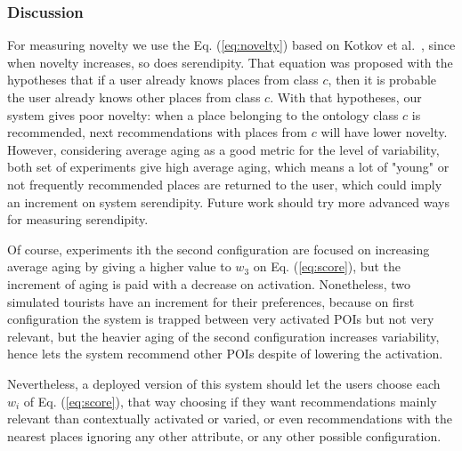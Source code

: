 \subsubsection{Discussion}

For measuring novelty we use the Eq. (\ref{eq:novelty}) based on Kotkov et al.~\cite{kotkov2016survey}, since when novelty increases, so does serendipity. That equation was proposed with the hypotheses that if a user already knows places from class $c$, then it is probable the user already knows other places from class $c$. With that hypotheses, our system gives poor novelty: when a place belonging to the ontology class $c$ is recommended, next recommendations with places from $c$ will have lower novelty. However, considering average aging as a good metric for the level of variability, both set of experiments
give high average aging, which means a lot of "young" or not frequently recommended places are returned to the user, which could imply an increment on system serendipity. Future work should try more advanced ways for measuring serendipity.

Of course, experiments ith the second configuration 
are focused on increasing average aging by giving a higher value to $w_3$ on Eq. (\ref{eq:score}), but the increment of aging is paid with a decrease
on activation. Nonetheless, two simulated tourists have an increment for their preferences, because on first configuration the system is trapped between very activated POIs but not very relevant, but the heavier aging of the second configuration increases variability, hence lets the system recommend other POIs despite of lowering the activation. 

Nevertheless, a deployed version of this system should let the users choose each $w_i$ of Eq. (\ref{eq:score}), that way choosing if they want recommendations mainly relevant than contextually activated or varied, or even recommendations with the nearest places ignoring any other attribute, or any other possible configuration.